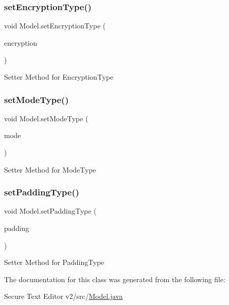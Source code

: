 \subsubsection{\texorpdfstring{set\+Encryption\+Type()}{setEncryptionType()}}
{\footnotesize\ttfamily void Model.\+set\+Encryption\+Type (\begin{DoxyParamCaption}\item[{Encryption\+Type}]{encryption }\end{DoxyParamCaption})}

Setter Method for Encryption\+Type \mbox{\label{class_model_a7b6d65f0bdf44c6d91267b917662fa0c}} 
\subsubsection{\texorpdfstring{set\+Mode\+Type()}{setModeType()}}
{\footnotesize\ttfamily void Model.\+set\+Mode\+Type (\begin{DoxyParamCaption}\item[{Mode\+Type}]{mode }\end{DoxyParamCaption})}

Setter Method for Mode\+Type \mbox{\label{class_model_ad173621b4a9b3242952a63379062818a}} 
\subsubsection{\texorpdfstring{set\+Padding\+Type()}{setPaddingType()}}
{\footnotesize\ttfamily void Model.\+set\+Padding\+Type (\begin{DoxyParamCaption}\item[{Padding\+Type}]{padding }\end{DoxyParamCaption})}

Setter Method for Padding\+Type 

The documentation for this class was generated from the following file\+:\begin{DoxyCompactItemize}
\item 
Secure Text Editor v2/src/\mbox{\hyperlink{_model_8java}{Model.\+java}}\end{DoxyCompactItemize}
